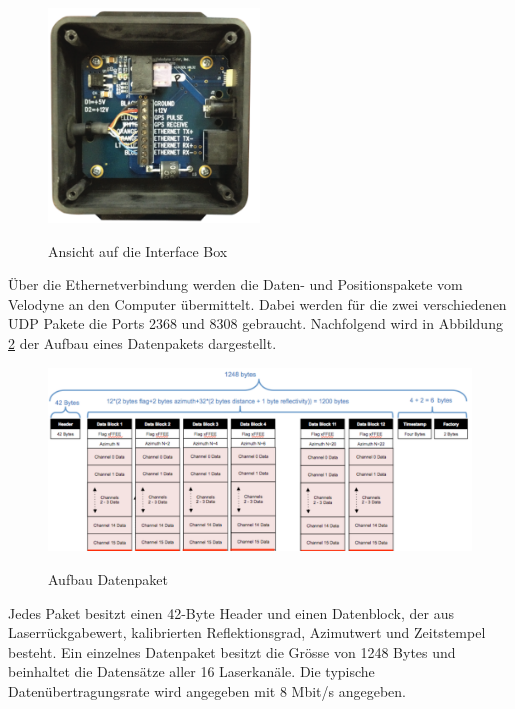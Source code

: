 \begin{figure}[H]
	\centering
	\includegraphics[width=0.5\textwidth]
	{resources/InterfaceBox.PNG}
	\caption[Ansicht auf die Interfacebox]{Ansicht auf die Interface Box} \protect\cite{velodyne}
	\label{fig:InterfaceBox}
\end{figure}

Über die Ethernetverbindung werden die Daten- und Positionspakete vom Velodyne an den Computer übermittelt. Dabei werden für die zwei verschiedenen \ac{UDP} Pakete die Ports 2368 und 8308 gebraucht. Nachfolgend wird in Abbildung \ref{fig:datapakets} der Aufbau eines Datenpakets dargestellt.

\begin{figure}[H]
	\centering
	\includegraphics[width=1.0\textwidth]
	{resources/datapakets.PNG}
	\caption[Aufbau Datenpaket]{Aufbau Datenpaket} \protect\cite{velodyne}
	\label{fig:datapakets}
\end{figure}

 Jedes Paket besitzt einen 42-Byte Header und einen Datenblock, der aus Laserrückgabewert, kalibrierten Reflektionsgrad, Azimutwert und Zeitstempel besteht. Ein einzelnes Datenpaket besitzt die Grösse von 1248 Bytes und beinhaltet die Datensätze aller 16 Laserkanäle. Die typische Datenübertragungsrate wird angegeben mit 8 Mbit/s angegeben.

